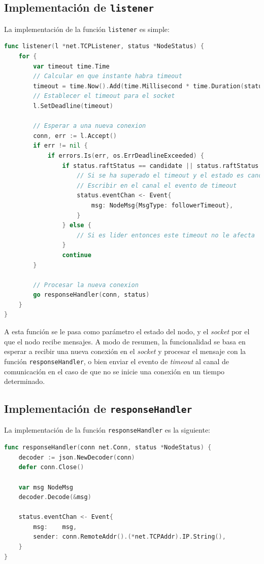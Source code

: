 \newpage

\subsection{Implementación de \texttt{listener}}

La implementación de la función \texttt{listener} es simple:

\begin{lstlisting}[language=go]
func listener(l *net.TCPListener, status *NodeStatus) {
	for {
		var timeout time.Time
		// Calcular en que instante habra timeout
		timeout = time.Now().Add(time.Millisecond * time.Duration(status.electionTimeout))
		// Establecer el timeout para el socket
		l.SetDeadline(timeout)

		// Esperar a una nueva conexion
		conn, err := l.Accept()
		if err != nil {
			if errors.Is(err, os.ErrDeadlineExceeded) {
				if status.raftStatus == candidate || status.raftStatus == follower {
					// Si se ha superado el timeout y el estado es candidate o follower
					// Escribir en el canal el evento de timeout
					status.eventChan <- Event{
						msg: NodeMsg{MsgType: followerTimeout},
					}
				} else {
					// Si es lider entonces este timeout no le afecta
				}
				continue
		}
		
		// Procesar la nueva conexion
		go responseHandler(conn, status)
	}
}
\end{lstlisting}

A esta función se le pasa como parámetro el estado del nodo, y el \textit{socket} por el que el nodo recibe mensajes. A modo de resumen, la funcionalidad se basa en esperar a recibir una nueva conexión en el \textit{socket} y procesar el mensaje con la función \texttt{responseHandler}, o bien enviar el evento de \textit{timeout} al canal de comunicación en el caso de que no se inicie una conexión en un tiempo determinado.

\subsection{Implementación de \texttt{responseHandler}}

La implementación de la función \texttt{responseHandler} es la siguiente:

\begin{lstlisting}[language=go]
func responseHandler(conn net.Conn, status *NodeStatus) {
	decoder := json.NewDecoder(conn)
	defer conn.Close()

	var msg NodeMsg
	decoder.Decode(&msg)
	
	status.eventChan <- Event{
		msg:    msg,
		sender: conn.RemoteAddr().(*net.TCPAddr).IP.String(),
	}
}
\end{lstlisting}

